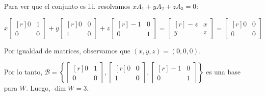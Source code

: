 \documentclass[11pt]{article}
\begin{document}
\begin{enumerate}
\begin{enumerate}
		Para ver que el conjunto es l.i. resolvamos $xA_1+yA_2+zA_3 = 0$:
		\begin{center}
		    $x\begin{bmatrix*}[r]
		        0 & 1 \\ 
		        0 & 0
		    \end{bmatrix*} + y
		    \begin{bmatrix*}[r]
		        0 & 0 \\ 
		        1 & 0
		    \end{bmatrix*} +z
		    \begin{bmatrix*}[r]
		        -1 & 0 \\ 
		        0 & 1
		    \end{bmatrix*} = 
		    \begin{bmatrix*}[r]
		        -z & x \\ 
		        y & z
		    \end{bmatrix*} =
		    \begin{bmatrix*}[r]
		        0 & 0 \\ 
		        0 & 0
		    \end{bmatrix*}$
		\end{center}
		
		Por igualdad de matrices, observamos que $(x,y,z)=(0,0,0)$. \par
		Por lo tanto, $\mathcal{B}= \left\{
		\begin{bmatrix*}[r]
		    0 & 1 \\ 
		    0 & 0
		\end{bmatrix*},
		\begin{bmatrix*}[r]
		    0 & 0 \\
		    1 & 0
		\end{bmatrix*},
		\begin{bmatrix*}[r]
		    -1 & 0 \\
		    0 & 1
		 \end{bmatrix*} \right\}$ es una base para $W$. Luego, $\dim W = 3$.
		

\end{enumerate}
\end{enumerate}
\end{document}
